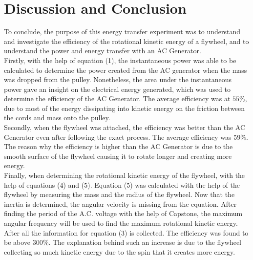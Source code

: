 \documentclass[11pt]{article}
\begin{document}
\section*{Discussion and Conclusion}
To conclude, the purpose of this energy transfer experiment was to understand and investigate the efficiency of the rotational kinetic energy of a flywheel, and to understand the power and energy transfer with an AC Generator.\\
Firstly, with the help of equation (1), the instantaneous power was able to be calculated to determine the power created from the AC generator when the mass was dropped from the pulley. Nonetheless, the area under the instantaneous power gave an insight on the electrical energy generated, which was used to determine the efficiency of the AC Generator. The average efficiency was at $55\%$, due to most of the energy dissipating into kinetic energy on the friction between the cords and mass onto the pulley.\\
Secondly, when the flywheel was attached, the efficiency was better than the AC Generator even after following the exact process. The average efficiency was $59\%$. The reason why the efficiency is higher than the AC Generator is due to the smooth surface of the flywheel causing it to rotate longer and creating more energy.\\
Finally, when determining the rotational kinetic energy of the flywheel, with the help of equations (4) and (5). Equation (5) was calculated with the help of the flywheel by measuring the mass and the radius of the flywheel. Now that the inertia is determined, the angular velocity is missing from the equation. After finding the period of the A.C. voltage with the help of Capstone, the maximum angular frequency will be used to find the maximum rotational kinetic energy. After all the information for equation (3) is collected. The efficiency was found to be above $300\%$. The explanation behind such an increase is due to the flywheel collecting so much kinetic energy due to the spin that it creates more energy. 

\newpage
\end{document}
